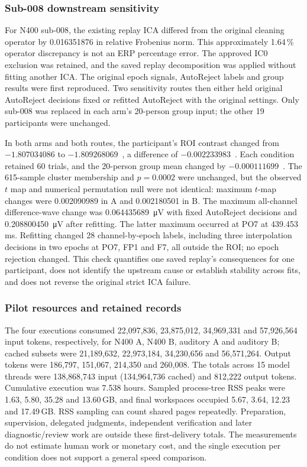 \subsubsection*{Sub-008 downstream sensitivity}

For N400 sub-008, the existing replay ICA differed from the original cleaning operator by 0.016351876 in relative Frobenius norm. This approximately 1.64\,\% operator discrepancy is not an ERP percentage error. The approved IC0 exclusion was retained, and the saved replay decomposition was applied without fitting another ICA. The original epoch signals, AutoReject labels and group results were first reproduced. Two sensitivity routes then either held original AutoReject decisions fixed or refitted AutoReject with the original settings. Only sub-008 was replaced in each arm's 20-person group input; the other 19 participants were unchanged.

In both arms and both routes, the participant's ROI contrast changed from \(-1.807034086\) to \(-1.809268069\)~\uV, a difference of \(-0.002233983\)~\uV. Each condition retained 60 trials, and the 20-person group mean changed by \(-0.000111699\)~\uV. The 615-sample cluster membership and $p=0.0002$ were unchanged, but the observed $t$ map and numerical permutation null were not identical: maximum $t$-map changes were 0.002090989 in A and 0.002180501 in B. The maximum all-channel difference-wave change was \SI{0.064435689}{\uV} with fixed AutoReject decisions and \SI{0.208800450}{\uV} after refitting. The latter maximum occurred at PO7 at 439.453\,ms. Refitting changed 28 channel-by-epoch labels, including three interpolation decisions in two epochs at PO7, FP1 and F7, all outside the ROI; no epoch rejection changed. This check quantifies one saved replay's consequences for one participant, does not identify the upstream cause or establish stability across fits, and does not reverse the original strict ICA failure.

\subsubsection*{Pilot resources and retained records}

The four executions consumed 22,097,836, 23,875,012, 34,969,331 and 57,926,564 input tokens, respectively, for N400 A, N400 B, auditory A and auditory B; cached subsets were 21,189,632, 22,973,184, 34,230,656 and 56,571,264. Output tokens were 186,797, 151,067, 214,350 and 260,008. The totals across 15 model threads were 138,868,743 input (134,964,736 cached) and 812,222 output tokens. Cumulative execution was 7.538 hours. Sampled process-tree RSS peaks were 1.63, 5.80, 35.28 and 13.60\,GB, and final workspaces occupied 5.67, 3.64, 12.23 and 17.49\,GB. RSS sampling can count shared pages repeatedly. Preparation, supervision, delegated judgments, independent verification and later diagnostic/review work are outside these first-delivery totals. The measurements do not estimate human work or monetary cost, and the single execution per condition does not support a general speed comparison.

\FloatBarrier
{}
